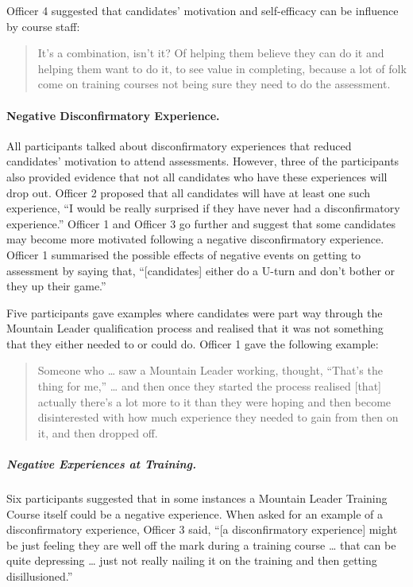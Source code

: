 \documentclass[
  12pt,
  a4paper,
]{book}
\begin{document}
Officer 4 suggested that candidates' motivation and self-efficacy can be influence by course staff:

\begin{quote}
It's a combination, isn't it? Of helping them believe they can do it and helping them want to do it, to see value in completing, because a lot of folk come on training courses not being sure they need to do the assessment.
\end{quote}

\hypertarget{negative-disconfirmatory-experience.}{%
\paragraph{Negative Disconfirmatory Experience.}\label{negative-disconfirmatory-experience.}}

All participants talked about disconfirmatory experiences that reduced candidates' motivation to attend assessments. However, three of the participants also provided evidence that not all candidates who have these experiences will drop out. Officer 2 proposed that all candidates will have at least one such experience, ``I would be really surprised if they have never had a disconfirmatory experience.'' Officer 1 and Officer 3 go further and suggest that some candidates may become more motivated following a negative disconfirmatory experience. Officer 1 summarised the possible effects of negative events on getting to assessment by saying that, ``{[}candidates{]} either do a U-turn and don't bother or they up their game.''

Five participants gave examples where candidates were part way through the Mountain Leader qualification process and realised that it was not something that they either needed to or could do. Officer 1 gave the following example:

\begin{quote}
Someone who \ldots{} saw a Mountain Leader working, thought, ``That's the thing for me,'' \ldots{} and then once they started the process realised {[}that{]} actually there's a lot more to it than they were hoping and then become disinterested with how much experience they needed to gain from then on it, and then dropped off.
\end{quote}

\hypertarget{negative-experiences-at-training.}{%
\subparagraph{Negative Experiences at Training.}\label{negative-experiences-at-training.}}

Six participants suggested that in some instances a Mountain Leader Training Course itself could be a negative experience. When asked for an example of a disconfirmatory experience, Officer 3 said, ``{[}a disconfirmatory experience{]} might be just feeling they are well off the mark during a training course \ldots{} that can be quite depressing \ldots{} just not really nailing it on the training and then getting disillusioned.''
\end{document}
